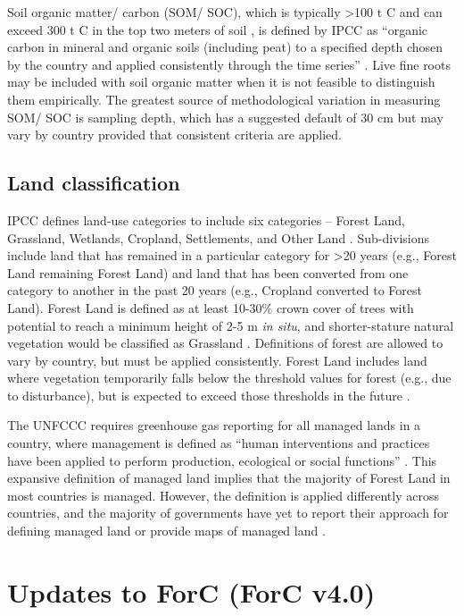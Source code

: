 \documentclass[, manuscript]{copernicus}
\begin{document}
Soil organic matter/ carbon (SOM/ SOC), which is typically
\textgreater100 t C and can exceed 300 t C in the top two meters of soil
\citep{sanderman_soil_2017}, is defined by IPCC as ``organic carbon in
mineral and organic soils (including peat) to a specified depth chosen
by the country and applied consistently through the time series''
\citep{ipcc_good_2003, ipcc_2006_2006}. Live fine roots may be included
with soil organic matter when it is not feasible to distinguish them
empirically. The greatest source of methodological variation in
measuring SOM/ SOC is sampling depth, which has a suggested default of
30 cm but may vary by country provided that consistent criteria are
applied.

\subsection{Land classification}

IPCC defines land-use categories to include six categories -- Forest
Land, Grassland, Wetlands, Cropland, Settlements, and Other Land
\citep{ipcc_2006_2006}. Sub-divisions include land that has remained in
a particular category for \textgreater20 years (e.g., Forest Land
remaining Forest Land) and land that has been converted from one
category to another in the past 20 years (e.g., Cropland converted to
Forest Land). Forest Land is defined as at least 10-30\% crown cover of
trees with potential to reach a minimum height of 2-5 m \emph{in situ},
and shorter-stature natural vegetation would be classified as Grassland
\citep{ipcc_good_2003}. Definitions of forest are allowed to vary by
country, but must be applied consistently. Forest Land includes land
where vegetation temporarily falls below the threshold values for forest
(e.g., due to disturbance), but is expected to exceed those thresholds
in the future \citep{ipcc_good_2003}.

The UNFCCC requires greenhouse gas reporting for all managed lands in a
country, where management is defined as ``human interventions and
practices have been applied to perform production, ecological or social
functions'' \citep{ipcc_2006_2006}. This expansive definition of managed
land implies that the majority of Forest Land in most countries is
managed. However, the definition is applied differently across
countries, and the majority of governments have yet to report their
approach for defining managed land or provide maps of managed land
\citep{ogle_delineating_2018, deng_comparing_2021}.

\section{Updates to ForC (ForC v4.0)}
\end{document}

